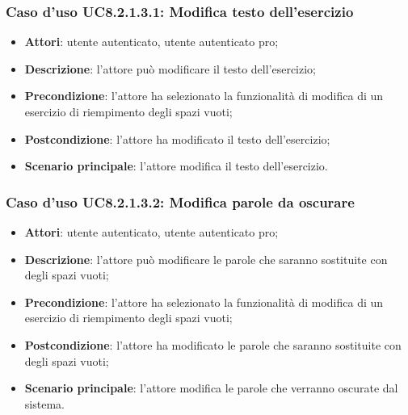 \subsubsection{Caso d'uso UC8.2.1.3.1: Modifica testo dell'esercizio}
	\begin{itemize}
		\item
			\textbf{Attori}: utente autenticato, utente autenticato pro;
		\item		
			\textbf{Descrizione}: l'attore può modificare il testo dell'esercizio;
		\item
			\textbf{Precondizione}: l'attore ha selezionato la funzionalità di modifica di un esercizio di riempimento degli spazi vuoti; 
		\item
			\textbf{Postcondizione}: l'attore ha modificato il testo dell'esercizio;
		\item
			\textbf{Scenario principale}: l'attore modifica il testo dell'esercizio.
	\end{itemize}


\subsubsection{Caso d'uso UC8.2.1.3.2: Modifica parole da oscurare}
	\begin{itemize}
		\item
			\textbf{Attori}: utente autenticato, utente autenticato pro;
		\item		
			\textbf{Descrizione}: l'attore può modificare le parole che saranno sostituite con degli spazi vuoti;
		\item
			\textbf{Precondizione}: l'attore ha selezionato la funzionalità di modifica di un esercizio di riempimento degli spazi vuoti; 
		\item
			\textbf{Postcondizione}: l'attore ha modificato le parole che saranno sostituite con degli spazi vuoti;
		\item
			\textbf{Scenario principale}: l'attore modifica le parole che verranno oscurate dal sistema.
	\end{itemize}
